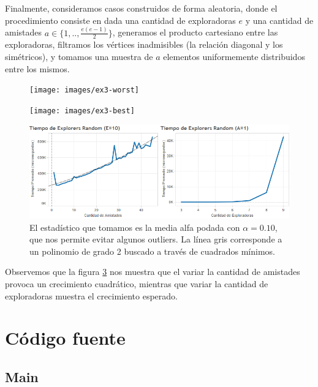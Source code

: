 \documentclass{article}
\theoremstyle{definition}
\theoremstyle{remark}
\begin{document}
Finalmente, consideramos casos construidos de forma aleatoria, donde el procedimiento consiste en dada una cantidad de exploradoras $e$ y una cantidad de amistades $a \in \{1, .., \frac{e(e-1)}{2}\}$, generamos el producto cartesiano entre las exploradoras, filtramos los vértices inadmisibles (la relación diagonal y los simétricos), y tomamos una muestra de $a$ elementos uniformemente distribuidos entre los mismos.

\begin{figure}[h!]
\centering
\label{grf:ex3-worst}
\texttt{[image: images/ex3-worst]}
\caption{}
\end{figure}

\begin{figure}[h!]
\centering
\label{grf:ex3-best}
\texttt{[image: images/ex3-best]}
\caption{}
\end{figure}

\begin{figure}[h!]
\centering
\label{grf:ex3-random}
\includegraphics[width=15cm]{images/ex3-random}
\caption{El estadístico que tomamos es la media alfa podada con $\alpha = 0.10$, que nos permite evitar algunos outliers. La línea gris corresponde a un polinomio de grado 2 buscado a través de cuadrados mínimos.}
\end{figure}

Observemos que la figura \ref{grf:ex3-random} nos muestra que el variar la cantidad de amistades provoca un crecimiento cuadrático, mientras que variar la cantidad de exploradoras muestra el crecimiento esperado.

\pagebreak

\section{Código fuente}

\subsection{Main}

\end{document}

